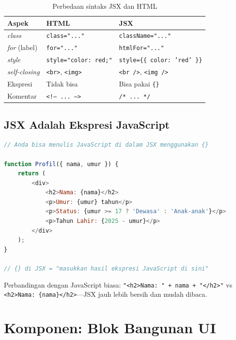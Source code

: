 \begin{table}[htbp]
\centering
\caption{Perbedaan sintaks JSX dan HTML}
\label{tab:13-jsx-vs-html}
\begin{tabular}{lll}
\toprule
\textbf{Aspek} & \textbf{HTML} & \textbf{JSX} \\
\midrule
\emph{class} & \texttt{class="..."} & \texttt{className="..."} \\
\emph{for} (label) & \texttt{for="..."} & \texttt{htmlFor="..."} \\
\emph{style} & \texttt{style="color: red;"} & \texttt{style=\{\{ color: 'red' \}\}} \\
\emph{self-closing} & \texttt{<br>}, \texttt{<img>} & \texttt{<br />}, \texttt{<img />} \\
Ekspresi & Tidak bisa & Bisa pakai \texttt{\{\}} \\
Komentar & \texttt{<!-- ... -->} & \texttt{/* ... */} \\
\bottomrule
\end{tabular}
\end{table}

\subsection{JSX Adalah Ekspresi JavaScript}

\begin{lstlisting}[language=JavaScript, caption={Ekspresi JavaScript di dalam JSX}, label={lst:13-jsx-ekspresi}]
// Anda bisa menulis JavaScript di dalam JSX menggunakan {}

function Profil({ nama, umur }) {
    return (
        <div>
            <h2>Nama: {nama}</h2>
            <p>Umur: {umur} tahun</p>
            <p>Status: {umur >= 17 ? 'Dewasa' : 'Anak-anak'}</p>
            <p>Tahun Lahir: {2025 - umur}</p>
        </div>
    );
}

// {} di JSX = "masukkan hasil ekspresi JavaScript di sini"
\end{lstlisting}

\begin{catatan}
Perbandingan dengan JavaScript biasa: \texttt{"<h2>Nama: " + nama + "</h2>"} vs \texttt{<h2>Nama: \{nama\}</h2>}---JSX jauh lebih bersih dan mudah dibaca.
\end{catatan}

\section{Komponen: Blok Bangunan UI}
\label{sec:13-komponen}

